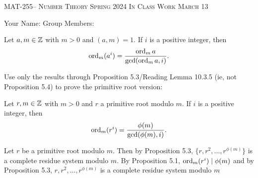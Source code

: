 \documentclass[handout]{ximera}
\date{March 13, 2024}
\begin{document}
\handoutAbstract
\maketitle
    \begin{center}%
        {\large \scshape MAT-255-- Number Theory \hfill Spring 2024 \hfill In Class Work March 13}%
        
        {\large
            Your Name: \hrulefill \quad Group Members:\hrulefill \quad \hrulefill
        \par}%
    \end{center}%
 

\begin{proposition}[Proposition 5.4]\label{prop:compare-order}
    Let $a,m\in\mathbb Z$ with $m>0$ and $(a,m)=1.$ If $i$ is a positive integer, then 
    \[\operatorname{ord}_m(a^i)=\frac{\operatorname{ord}_m a}{\gcd(\operatorname{ord}_m a,i)}.\]
\end{proposition}

\begin{br}
    Use only the results through Proposition 5.3/Reading Lemma 10.3.5 (ie, not Proposition 5.4) to prove the primitive root version:


    \begin{proposition}
        Let $r,m\in\mathbb Z$ with $m>0$ and $r$ a primitive root modulo $m.$
        If $i$ is a positive integer, then 
    \[\operatorname{ord}_m(r^i)=\frac{\phi(m)}{\gcd(\phi(m),i)}.\]
    \end{proposition}
    \begin{solution}
        Let $r$ be a primitive root modulo $m.$ Then by Proposition 5.3, $\{r,r^2,\dots,r^{\phi(m)}\}$ is a complete residue system modulo $m.$
        By Proposition 5.1, $\operatorname{ord}_m(r^i)\mid \phi(m)$ and by Proposition 5.3, $r,r^2,\dots,r^{\phi(m)}$ is a complete residue system modulo $m$ 
    \end{solution}
    \pdfOnly{\ifhandout
        \vfill
        \else\fi}
\end{br}
\end{document}
